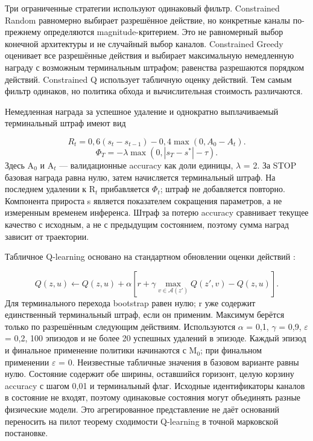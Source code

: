 \documentclass[10pt,a4paper]{article}
\begin{document}
Три ограниченные стратегии используют одинаковый фильтр. Constrained Random равномерно выбирает разрешённое действие, но конкретные каналы по-прежнему определяются magnitude-критерием. Это не равномерный выбор конечной архитектуры и не случайный выбор каналов. Constrained Greedy оценивает все разрешённые действия и выбирает максимальную немедленную награду с возможным терминальным штрафом; равенства разрешаются порядком действий. Constrained Q использует табличную оценку действий. Тем самым фильтр одинаков, но политика обхода и вычислительная стоимость различаются.

Немедленная награда за успешное удаление и однократно выплачиваемый терминальный штраф имеют вид

\begin{equation}
R_t=0{,}6(s_t-s_{t-1})-0{,}4\max(0,A_0-A_t).
\end{equation}
\begin{equation}
\Phi_T=-\lambda\max(0,|s_T-s^*|-\tau).
\end{equation}
Здесь A$_0$ и A$_t$ — валидационные accuracy как доли единицы, $\lambda$ = 2. За STOP базовая награда равна нулю, затем начисляется терминальный штраф. На последнем удалении к R$_t$ прибавляется $\Phi_t$; штраф не добавляется повторно. Компонента прироста s является показателем сокращения параметров, а не измеренным временем инференса. Штраф за потерю accuracy сравнивает текущее качество с исходным, а не с предыдущим состоянием, поэтому сумма наград зависит от траектории.

Табличное Q-learning основано на стандартном обновлении оценки действий \cite{r13}:

\begin{equation}
Q(z,u)\leftarrow Q(z,u)+\alpha\left[r+\gamma\max_{v\in\mathcal{A}(z')}Q(z',v)-Q(z,u)\right].
\end{equation}
Для терминального перехода bootstrap равен нулю; r уже содержит единственный терминальный штраф, если он применим. Максимум берётся только по разрешённым следующим действиям. Используются $\alpha$ = 0,1, $\gamma$ = 0,9, $\varepsilon$ = 0,2, 100 эпизодов и не более 20 успешных удалений в эпизоде. Каждый эпизод и финальное применение политики начинаются с M$_0$; при финальном применении $\varepsilon$ = 0. Неизвестные табличные значения в базовом варианте равны нулю. Состояние содержит обе ширины, оставшийся горизонт, целую корзину accuracy с шагом 0,01 и терминальный флаг. Исходные идентификаторы каналов в состояние не входят, поэтому одинаковые состояния могут объединять разные физические модели. Это агрегированное представление не даёт оснований переносить на пилот теорему сходимости Q-learning в точной марковской постановке.
\end{document}
